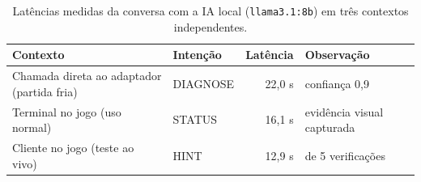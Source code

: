 \begin{table}[htbp]
\centering
\caption{Latências medidas da conversa com a IA local (\texttt{llama3.1:8b}) em três contextos independentes.}
\label{tab:latencia}
\footnotesize
\begin{tabular}{@{}>{\raggedright\arraybackslash}p{5.4cm} l r >{\raggedright\arraybackslash}p{3.4cm}@{}}
\toprule
Contexto & Intenção & Latência & Observação \\
\midrule
Chamada direta ao adaptador (partida fria) & DIAGNOSE & 22,0 s & confiança 0,9 \\
Terminal no jogo (uso normal) & STATUS & 16,1 s & evidência visual capturada \\
Cliente no jogo (teste ao vivo) & HINT & 12,9 s & 5 de 5 verificações \\
\bottomrule
\end{tabular}
\par\vspace{2pt}{\footnotesize Fonte: elaborado pelo autor (2026). Uma execução por contexto; valores indicativos, não estatísticos.}
\end{table}
